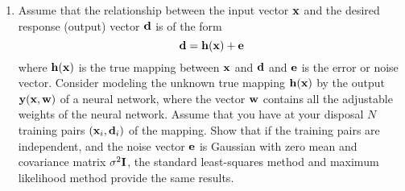 \documentclass[10pt]{article}
\begin{document}
\begin{enumerate}
\vspace{2mm}

\item Assume that the relationship between the input vector ${\bf x}$
  and the desired response (output) vector ${\bf d}$ is of the form
  \[{\bf d} = {\bf h}({\bf x}) + {\bf e}\]
  where ${\bf h}({\bf x})$ is the true mapping between ${\bf x}$ and ${\bf d}$
  and ${\bf e}$ is the error or noise vector. Consider modeling the unknown
  true mapping ${\bf h}({\bf x})$ by the output ${\bf y}({\bf x},{\bf w})$
  of a neural network, where the vector ${\bf w}$ contains all the adjustable
  weights of the neural network. Assume that you have at your disposal
  $N$ training pairs $({\bf x}_i,{\bf d}_i)$ of the mapping. Show that if the
  training pairs are independent, and the noise vector ${\bf e}$
  is Gaussian with zero mean and covariance matrix $\sigma^2 {\bf I}$, the standard
  least-squares method and maximum likelihood method provide the same results.

\end{enumerate}
\end{document}
